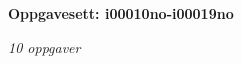 \centerline{\bf Oppgavesett: i00010no-i00019no}
\vskip 10pt
\centerline{\it 10 oppgaver}\vskip 10pt
\vskip 10pt
